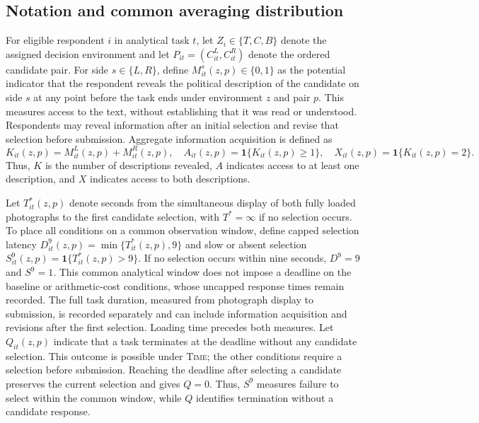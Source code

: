 \documentclass[11pt]{article}\usepackage[]{graphicx}\usepackage[]{xcolor}
\newcommand{\armT}{\textsc{Time}}
\begin{document}
\subsection{Notation and common averaging distribution}

For eligible respondent $i$ in analytical task $t$, let $Z_i\in\{T,C,B\}$ denote the assigned decision environment and let $P_{it}=(C^L_{it},C^R_{it})$ denote the ordered candidate pair. For side $s\in\{L,R\}$, define $M^s_{it}(z,p)\in\{0,1\}$ as the potential indicator that the respondent reveals the political description of the candidate on side $s$ at any point before the task ends under environment $z$ and pair $p$. This measures access to the text, without establishing that it was read or understood. Respondents may reveal information after an initial selection and revise that selection before submission. Aggregate information acquisition is defined as
\[
K_{it}(z,p)=M^L_{it}(z,p)+M^R_{it}(z,p),\quad
A_{it}(z,p)=\mathbf 1\{K_{it}(z,p)\geq 1\},\quad
X_{it}(z,p)=\mathbf 1\{K_{it}(z,p)=2\}.
\]
Thus, $K$ is the number of descriptions revealed, $A$ indicates access to at least one description, and $X$ indicates access to both descriptions.

Let $T^*_{it}(z,p)$ denote seconds from the simultaneous display of both fully loaded photographs to the first candidate selection, with $T^*=\infty$ if no selection occurs. To place all conditions on a common observation window, define capped selection latency $D^{9}_{it}(z,p)=\min\{T^*_{it}(z,p),9\}$ and slow or absent selection $S^{9}_{it}(z,p)=\mathbf 1\{T^*_{it}(z,p)>9\}$. If no selection occurs within nine seconds, $D^{9}=9$ and $S^{9}=1$. This common analytical window does not impose a deadline on the baseline or arithmetic-cost conditions, whose uncapped response times remain recorded. The full task duration, measured from photograph display to submission, is recorded separately and can include information acquisition and revisions after the first selection. Loading time precedes both measures. Let $Q_{it}(z,p)$ indicate that a task terminates at the deadline without any candidate selection. This outcome is possible under \armT; the other conditions require a selection before submission. Reaching the deadline after selecting a candidate preserves the current selection and gives $Q=0$. Thus, $S^{9}$ measures failure to select within the common window, while $Q$ identifies termination without a candidate response.
\end{document}
